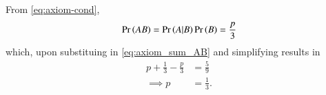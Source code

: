 From \eqref{eq:axiom-cond},
\begin{align}
\Pr\left(AB\right)=\Pr\left(A|B\right)\Pr\left(B\right)
	=\frac{p}{3}
\end{align}
which, upon substituing in
\eqref{eq:axiom_sum_AB}
and simplifying 
results in 
\begin{align}
	p+\frac{1}{3}-\frac{p}{3}&=\frac{5}{9}
\\
	\implies p&=\frac{1}{3}.
\end{align}
